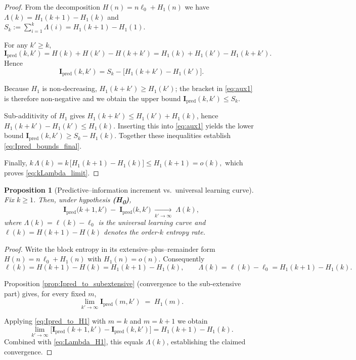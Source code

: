 \documentclass{article}
\newtheorem{proposition}[theorem]{Proposition}
\begin{document}
\begin{proof}
From the decomposition \(H(n)=n\ell_{0}+H_{1}(n)\) we have
\(
  \Lambda(k)=H_{1}(k+1)-H_{1}(k)
\)
and
\(
  S_{k}:=\sum_{i=1}^{k}\Lambda(i)=H_{1}(k+1)-H_{1}(1).
\)

For any \(k'\ge k\),
\[
\mathbf I_{\mathrm{pred}}(k,k')
  =H(k)+H(k')-H(k+k')
  =H_{1}(k)+H_{1}(k')-H_{1}(k+k').
\]
Hence
\begin{equation}\label{eq:aux1}
  \mathbf I_{\mathrm{pred}}(k,k')
  =S_{k}-\bigl[H_{1}(k+k')-H_{1}(k')\bigr].
\end{equation}

Because \(H_{1}\) is non-decreasing,
\(H_{1}(k+k')\ge H_{1}(k')\); the bracket in
\eqref{eq:aux1} is therefore non-negative and we obtain the upper bound
\(
  \mathbf I_{\mathrm{pred}}(k,k')\le S_{k}.
\)

Sub-additivity of \(H_{1}\) gives
\(H_{1}(k+k')\le H_{1}(k')+H_{1}(k)\), hence
\(H_{1}(k+k')-H_{1}(k')\le H_{1}(k)\).
Inserting this into \eqref{eq:aux1} yields the lower bound
\(
  \mathbf I_{\mathrm{pred}}(k,k')\ge S_{k}-H_{1}(k).
\)
Together these inequalities establish \eqref{eq:Ipred_bounds_final}.

Finally,
\(
  k\,\Lambda(k)
  =k\,\bigl[H_{1}(k+1)-H_{1}(k)\bigr]
  \le H_{1}(k+1)=o(k),
\)
which proves \eqref{eq:kLambda_limit}.
\end{proof}





\begin{proposition}[Predictive–information increment vs.\ universal learning curve]
\label{prop:learning_curve_approximation}
Fix \(k\ge 1\).  
Then, under hypothesis \textbf{(H\textsubscript{0})},
\[
   \mathbf I_{\mathrm{pred}}\!\bigl(k\!+\!1,k'\bigr)
   \;-\;
   \mathbf I_{\mathrm{pred}}\!\bigl(k,k'\bigr)
   \;\xrightarrow[k'\to\infty]{}\;
   \Lambda(k),
\]
where \(\Lambda(k)=\ell(k)-\ell_0\) is the universal learning curve and  
\(\ell(k)=H(k+1)-H(k)\) denotes the order-\(k\) entropy rate.
\end{proposition}

\begin{proof}

Write the block entropy in its extensive–plus–remainder form  
\(H(n)=n\,\ell_0+H_1(n)\) with \(H_1(n)=o(n)\).
Consequently
\[
   \ell(k)=H(k+1)-H(k)=H_1(k+1)-H_1(k),
   \qquad
   \Lambda(k)=\ell(k)-\ell_0
             =H_1(k+1)-H_1(k).
\tag{1}\label{eq:Lambda_H1}
\]

Proposition \ref{prop:Ipred_to_subextensive} (convergence to the
sub-extensive part) gives, for every fixed \(m\),
\[
   \lim_{k'\to\infty}\mathbf I_{\mathrm{pred}}(m,k')
   \;=\;
   H_1(m).
\tag{2}\label{eq:Ipred_to_H1}
\]

Applying \eqref{eq:Ipred_to_H1} with \(m=k\) and \(m=k+1\) we obtain
\[
   \lim_{k'\to\infty}
   \bigl[
      \mathbf I_{\mathrm{pred}}(k+1,k')
      -\mathbf I_{\mathrm{pred}}(k,k')
   \bigr]
   =H_1(k+1)-H_1(k).
\]
Combined with \eqref{eq:Lambda_H1}, this equals \(\Lambda(k)\),
establishing the claimed convergence.
\end{proof}
\end{document}
